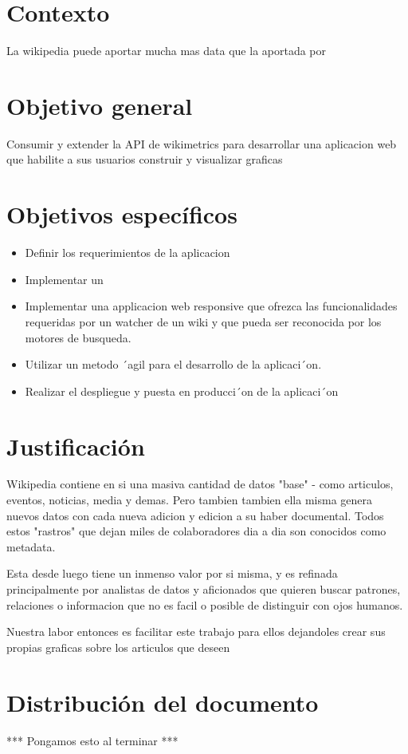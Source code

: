 
\section{Contexto}

La wikipedia puede aportar mucha mas data que la aportada por


\section{Objetivo general}
Consumir y extender la API de wikimetrics para desarrollar una aplicacion web que habilite a sus usuarios construir y visualizar graficas

\section{Objetivos específicos}
\begin{itemize}{}{}
    \item Definir los requerimientos de la aplicacion
    \item Implementar un
    \item Implementar una applicacion web responsive que ofrezca las funcionalidades requeridas por un watcher de un wiki y que pueda ser reconocida por los motores de busqueda.
    \item Utilizar un metodo ´agil para el desarrollo de la aplicaci´on.
    \item Realizar el despliegue y puesta en producci´on de la aplicaci´on
\end{itemize}


\section{Justificación}
Wikipedia contiene en si una masiva cantidad de datos "base" - como articulos, eventos, noticias, media y demas. Pero tambien  tambien ella misma genera nuevos datos con cada nueva adicion y edicion a su haber documental. Todos estos "rastros" que dejan miles de colaboradores dia a dia son conocidos como metadata.

Esta desde luego tiene un inmenso valor por si misma, y es refinada principalmente por analistas de datos y aficionados que quieren buscar patrones, relaciones o informacion que no es facil o posible de distinguir con ojos humanos.

Nuestra labor entonces es facilitar este trabajo para ellos dejandoles crear sus propias graficas sobre los articulos que deseen


\section{Distribución del documento}

*** Pongamos esto al terminar ***

